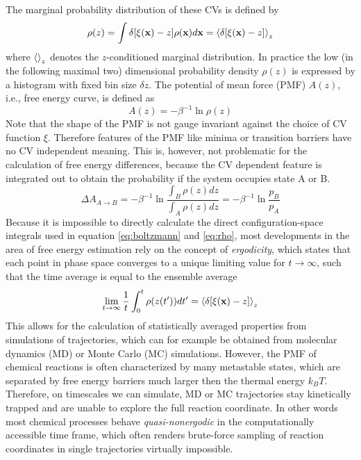 The marginal probability distribution of these CVs is defined by
\begin{equation}
  \rho(z)=\int \delta[\xi(\textbf{x})-z]\rho(\textbf{x})d\textbf{x}=\braket{\delta [\xi(\textbf{x})-z]}_z
  \label{eq:rho}
\end{equation}
where $\braket{}_z$ denotes the $z$-conditioned marginal distribution.\autocite{chipot2007free}
In practice the low (in the following maximal two) dimensional probability density $\rho(z)$ is expressed by a histogram with fixed bin size $\delta z$.
The potential of mean force (PMF) $A(z)$, i.e., free energy curve, is defined as
\begin{equation}
  A(z) = -\beta^{-1}\ln \rho(z)
  \label{eq:free energy}
\end{equation}
Note that the shape of the PMF is not gauge invariant against the choice of CV function $\xi$.
Therefore features of the PMF like minima or transition barriers have no CV independent meaning.\autocite{hartmann2011two}
This is, however, not problematic for the calculation of free energy differences, because the CV dependent feature is integrated out to obtain the probability if the system occupies state A or B.
\begin{equation}
  \Delta A_{A\rightarrow B} = -\beta^{-1}\ln \frac{\int_B \rho(z)dz}{\int_A \rho(z)dz}=-\beta^{-1}\ln \frac{p_B}{p_A}
  \label{eq:free energy diff}
\end{equation}
Because it is impossible to directly calculate the direct configuration-space integrals used in equation \ref{eq:boltzmann} and \ref{eq:rho},\autocite{chipot2007free}
most developments in the area of free energy estimation rely on the concept of \textit{ergodicity}\autocite{schutte2013metastability}, which states that each point in phase space converges to a unique limiting value for $t\rightarrow\infty$, such that the time average is equal to the ensemble average\autocite{barducci2011metadynamics}
\begin{equation}
   \lim_{t\to\infty}\frac{1}{t} \int_0^t \rho(z(t')) dt' = \braket{\delta [\xi(\textbf{x})-z]}_z
  \label{eq:ergodic}
\end{equation}
This allows for the calculation of statistically averaged properties from simulations of trajectories, which can for example be obtained from molecular dynamics (MD) or Monte Carlo (MC) simulations.
However, the PMF of chemical reactions is often characterized by many metastable states, which are separated by free energy barriers much larger then the thermal energy $k_B T$.
Therefore, on timescales we can simulate, MD or MC trajectories stay kinetically trapped and are unable to explore the full reaction coordinate.
In other words most chemical processes behave \textit{quasi-nonergodic} in the computationally accessible time frame, which often renders brute-force sampling of reaction coordinates in single trajectories virtually impossible.

